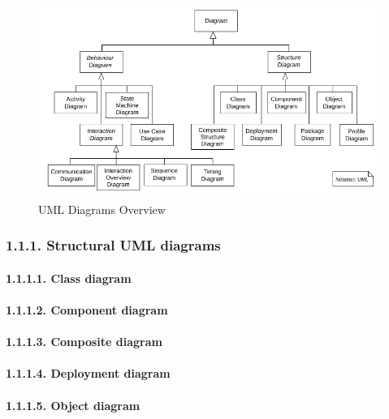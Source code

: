 \documentclass[
]{article}
\begin{document}
\begin{figure}
\centering
\includegraphics{../requirements/uml_diagrams_overview.png}
\caption{UML Diagrams Overview}
\end{figure}

\hypertarget{structural-uml-diagrams}{%
\subsubsection{1.1.1. Structural UML
diagrams}\label{structural-uml-diagrams}}

\hypertarget{class-diagram}{%
\paragraph{1.1.1.1. Class diagram}\label{class-diagram}}

\hypertarget{component-diagram}{%
\paragraph{1.1.1.2. Component diagram}\label{component-diagram}}

\hypertarget{composite-diagram}{%
\paragraph{1.1.1.3. Composite diagram}\label{composite-diagram}}

\hypertarget{deployment-diagram}{%
\paragraph{1.1.1.4. Deployment diagram}\label{deployment-diagram}}

\hypertarget{object-diagram}{%
\paragraph{1.1.1.5. Object diagram}\label{object-diagram}}
\end{document}
